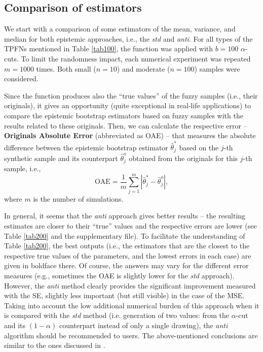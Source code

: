 

\subsection{Comparison of estimators}

We start with a comparison of some estimators of the mean, variance, and median for both epistemic approaches, i.e., the \emph{std} and \emph{anti}.
For all types of the TPFNs mentioned in Table \ref{tab100}, the function  was applied with $b=100$ $\alpha$-cuts.
To limit the randomness impact, each numerical experiment was repeated $m=1000$ times.
Both small ($n=10$) and moderate ($n=100$) samples were considered.

Since the function   produces also the ``true values'' of the fuzzy samples (i.e., their originals), it gives an opportunity (quite exceptional in real-life applications) to compare the epistemic bootstrap estimators based on fuzzy samples with the results related to these originals.
Then, we can calculate the respective error -- \textbf{Originals Absolute Error} (abbreviated as OAE) -- that measures the absolute difference between the epistemic bootstrap estimator $\hat{\theta}^*_{j}$ based on the $j$-th synthetic sample and its counterpart $\hat{\theta}^o_{j}$ obtained from the originals for this $j$-th sample, i.e.,
\begin{equation}
    \text{OAE} = \frac{1}{m}\sum_{j=1}^{m} \left | \hat{\theta}^*_{j} - \hat{\theta}^o_{j} \right | ,
\end{equation}
where $m$ is the number of simulations.

In general, it seems that the \emph{anti} approach gives better results -- the resulting estimates are closer to their ``true'' values and the respective errors are lower (see Table \ref{tab200} and the supplementary file).
To facilitate the understanding of Table \ref{tab200}, the best outputs (i.e., the estimators that are the closest to the respective true values of the parameters, and the lowest errors in each case) are given in boldface there.
Of course, the answers may vary for the different error measures (e.g., sometimes the OAE is slightly lower for the \emph{std} approach).
However, the \emph{anti} method clearly provides the significant improvement measured with the SE, slightly less important (but still visible) in the case of the MSE.
Taking into account the low additional numerical burden of this approach when it is compared with the \emph{std} method (i.e. generation of two values: from the $\alpha$-cut and its $(1-\alpha)$ counterpart instead of only a single drawing), the \emph{anti} algorithm should be recommended to users.
The above-mentioned conclusions are similar to the ones discussed in \cite{grzegorzewski2021,pgmr2022}.


